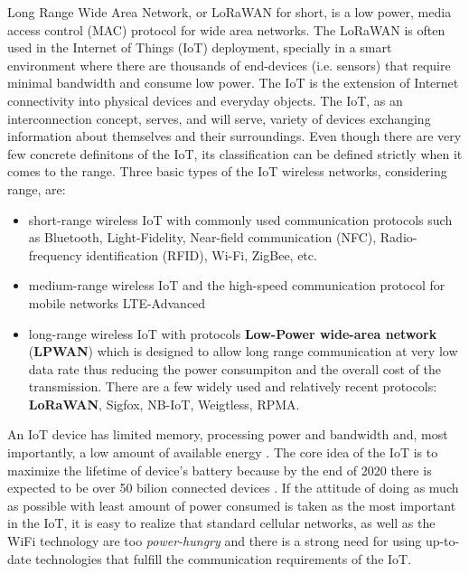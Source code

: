 
Long Range Wide Area Network, or LoRaWAN for short, is a low power, media access control (MAC) protocol for wide area networks.
The LoRaWAN is often used in the Internet of Things (IoT) deployment, specially in a smart environment where there are thousands of end-devices (i.e. sensors) that require minimal bandwidth and consume low power.
The IoT is the extension of Internet connectivity into physical devices and everyday objects. 
The IoT, as an interconnection concept, serves, and will serve, variety of devices exchanging information about themselves and their surroundings.
Even though there are very few concrete definitons of the IoT, its classification can be defined strictly when it comes to the range. 
Three basic types of the IoT wireless networks, considering range, are:
\begin{itemize}
    \item short-range wireless IoT with commonly used communication protocols such as Bluetooth, Light-Fidelity, Near-field communication (NFC), Radio-frequency identification (RFID), Wi-Fi, ZigBee, etc.
    \item medium-range wireless IoT and the high-speed communication protocol for mobile networks LTE-Advanced
    \item long-range wireless IoT with protocols \textbf{Low-Power wide-area network} \\ (\textbf{LPWAN}) which is designed to allow long range communication at very low data rate thus reducing the power consumpiton and the overall cost of the transmission. There are a few widely used and relatively recent protocols: \textbf{LoRaWAN}, Sigfox, NB-IoT, Weigtless, RPMA.
\end{itemize}
An IoT device has limited memory, processing power and bandwidth and, most importantly, a low amount of available energy \cite{Aloys_LoRa}.
The core idea of the IoT is to maximize the lifetime of device's battery because by the end of 2020 there is expected to be over 50 bilion connected devices \cite{Evans_IoT}.
If the attitude of doing as much as possible with least amount of power consumed is taken as the most important in the IoT, it is easy to realize that standard cellular networks, as well as the WiFi technology are too \textit{power-hungry} and there is a strong need for using up-to-date technologies that fulfill the communication requirements of the IoT.


